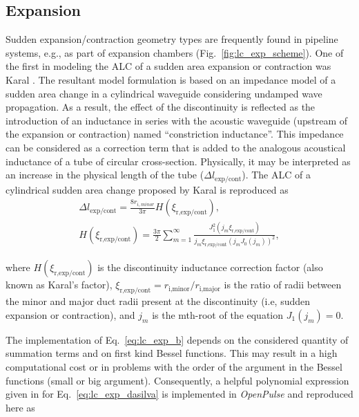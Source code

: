 \documentclass[12pt]{article}
\begin{document}
\subsection{Expansion}

Sudden expansion/contraction geometry types are frequently found in pipeline systems, e.g., as part of expansion chambers (Fig.~\ref{fig:lc_exp_scheme}). One of the first in modeling the \acrshort{ALC} of a sudden area expansion or contraction was Karal \cite{karal}. The resultant model formulation is based on an impedance model of a sudden area change in a cylindrical waveguide considering undamped wave propagation. As a result, the effect of the discontinuity is reflected as the introduction of an inductance in series with the acoustic waveguide (upstream of the expansion or contraction) named ``constriction inductance''. This impedance can be considered as a correction term that is added to the analogous acoustical inductance of a tube of circular cross-section. Physically, it may be interpreted as an increase in the physical length of the tube ($\Delta l_{\text{exp/cont}}$). The \acrshort{ALC} of a cylindrical sudden area change proposed by Karal \cite{karal} is reproduced as
%
\begin{gather} \label{eq:lc_exp}
	\Delta l_{\text{exp/cont}} = \frac{8 r_{i,minor} }{ 3 \pi} H( \xi_{\text{r,exp/cont}} ) , \\ \label{eq:lc_exp_b}
	H( \xi_{\text{r,exp/cont}} ) = \frac{3 \pi }{ 2}  \sum_{m=1}^{\infty} \frac{J_1^2( j_m \xi_{\text{r,exp/cont}} )}{ j_m \xi_{\text{r,exp/cont}}  ( j_m J_0(j_m))^2 },
\end{gather}

\noindent where $H( \xi_{\text{r,exp/cont}} )$ is the discontinuity inductance correction factor (also known as Karal's factor), $\xi_{\text{r,exp/cont}} = r_{\text{i,minor}}/r_{\text{i,major}}$ is the ratio of radii between the minor and major duct radii present at the discontinuity (i.e, sudden expansion or contraction), and $j_m$ is the mth-root of the equation $J_1(j_m)=0$. 

The implementation of Eq.~\ref{eq:lc_exp_b} depends on the considered quantity of summation terms and on first kind Bessel functions. This may result in a high computational cost or in problems with the order of the argument in the Bessel functions (small or big argument). Consequently, a helpful polynomial expression given in \cite{daSilva_nunes} for Eq.~\ref{eq:lc_exp_dasilva} is implemented in \textit{OpenPulse} and reproduced here as
\end{document}
